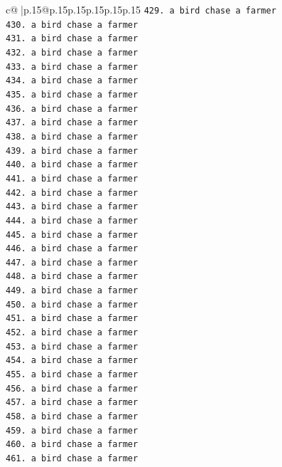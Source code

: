 \documentclass{article}
\begin{document}
{\begin{supertabular}{c@{$\;$}|p{.15\linewidth}@{}p{.15\linewidth}p{.15\linewidth}p{.15\linewidth}p{.15\linewidth}p{.15\linewidth}}
{{{\texttt{429. a bird chase a farmer} \\
\texttt{430. a bird chase a farmer} \\
\texttt{431. a bird chase a farmer} \\
\texttt{432. a bird chase a farmer} \\
\texttt{433. a bird chase a farmer} \\
\texttt{434. a bird chase a farmer} \\
\texttt{435. a bird chase a farmer} \\
\texttt{436. a bird chase a farmer} \\
\texttt{437. a bird chase a farmer} \\
\texttt{438. a bird chase a farmer} \\
\texttt{439. a bird chase a farmer} \\
\texttt{440. a bird chase a farmer} \\
\texttt{441. a bird chase a farmer} \\
\texttt{442. a bird chase a farmer} \\
\texttt{443. a bird chase a farmer} \\
\texttt{444. a bird chase a farmer} \\
\texttt{445. a bird chase a farmer} \\
\texttt{446. a bird chase a farmer} \\
\texttt{447. a bird chase a farmer} \\
\texttt{448. a bird chase a farmer} \\
\texttt{449. a bird chase a farmer} \\
\texttt{450. a bird chase a farmer} \\
\texttt{451. a bird chase a farmer} \\
\texttt{452. a bird chase a farmer} \\
\texttt{453. a bird chase a farmer} \\
\texttt{454. a bird chase a farmer} \\
\texttt{455. a bird chase a farmer} \\
\texttt{456. a bird chase a farmer} \\
\texttt{457. a bird chase a farmer} \\
\texttt{458. a bird chase a farmer} \\
\texttt{459. a bird chase a farmer} \\
\texttt{460. a bird chase a farmer} \\
\texttt{461. a bird chase a farmer} \\
}}}
\end{supertabular}}
\end{document}
